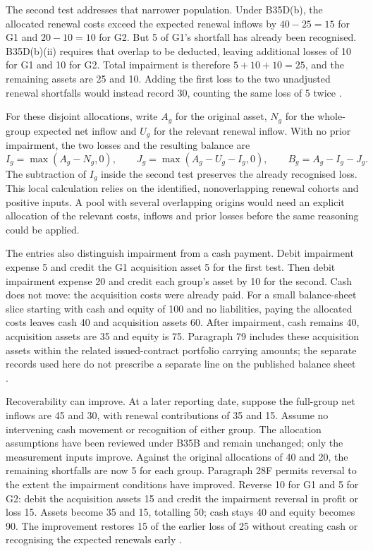 The second test addresses that narrower population. Under B35D(b), the
allocated renewal costs exceed the expected renewal inflows by $40-25=15$
for G1 and $20-10=10$ for G2. But 5 of G1's shortfall has already been
recognised. B35D(b)(ii) requires that overlap to be deducted, leaving
additional losses of 10 for G1 and 10 for G2. Total impairment is therefore
$5+10+10=25$, and the remaining assets are 25 and 10. Adding the first loss
to the two unadjusted renewal shortfalls would instead record 30, counting
the same loss of 5 twice \citep[paragraph B35D]{aasb17}.

For these disjoint allocations, write $A_g$ for the original asset, $N_g$ for
the whole-group expected net inflow and $U_g$ for the relevant renewal
inflow. With no prior impairment, the two losses and the resulting balance
are
\[
 I_g=\max(A_g-N_g,0),\qquad
 J_g=\max(A_g-U_g-I_g,0),\qquad
 B_g=A_g-I_g-J_g.
\]
The subtraction of $I_g$ inside the second test preserves the already
recognised loss. This local calculation relies on the identified, nonoverlapping
renewal cohorts and positive inputs. A pool with several overlapping origins
would need an explicit allocation of the relevant costs, inflows and prior
losses before the same reasoning could be applied.

\clearpage
The entries also distinguish impairment from a cash payment. Debit impairment
expense 5 and credit the G1 acquisition asset 5 for the first test. Then debit
impairment expense 20 and credit each group's asset by 10 for the second.
Cash does not move: the acquisition costs were already paid. For a small
balance-sheet slice starting with cash and equity of 100 and no liabilities,
paying the allocated costs leaves cash 40 and acquisition assets 60. After
impairment, cash remains 40, acquisition assets are 35 and equity is 75.
Paragraph 79 includes these acquisition assets within the related issued-contract
portfolio carrying amounts; the separate records used here do not prescribe
a separate line on the published balance sheet
\citep[paragraphs 28E and 79]{aasb17}.

Recoverability can improve. At a later reporting date, suppose the full-group
net inflows are 45 and 30, with renewal contributions of 35 and 15. Assume no
intervening cash movement or recognition of either group. The allocation
assumptions have been reviewed under B35B and remain unchanged; only the
measurement inputs improve. Against the original allocations of 40 and 20,
the remaining shortfalls are now 5 for each group. Paragraph 28F permits
reversal to the extent the impairment conditions have improved. Reverse 10
for G1 and 5 for G2: debit the acquisition assets 15 and credit the impairment
reversal in profit or loss 15. Assets become 35 and 15, totalling 50; cash
stays 40 and equity becomes 90. The improvement restores 15 of the earlier
loss of 25 without creating cash or recognising the expected renewals early
\citep[paragraphs 28F and B35B]{aasb17}.

